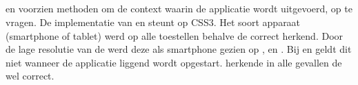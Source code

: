 \subsection{}
\label{sec:evaluatie-ondersteuning-toestel}

\st{} en \kendo{} voorzien methoden om de context waarin de applicatie wordt uitgevoerd,  op te vragen.
De implementatie van \jqm{} en \lungo{} steunt op CSS3.
Het soort apparaat (smartphone of tablet) werd op alle toestellen behalve de \gtab correct herkend.
Door de lage resolutie van de \gtab{} werd deze als smartphone gezien op \st{},  \jqm{} en \lungo{}.
Bij \jqm{} en \lungo{} geldt dit niet wanneer de applicatie liggend wordt opgestart.
\kendo{} herkende in alle gevallen de \gtab{} wel correct.


% 
% 
% 

\subsection{}
\label{sec:evaluatie-ondersteuning-formulieren}


